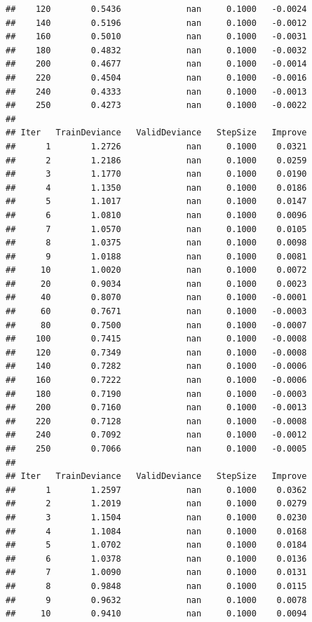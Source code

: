 \documentclass[]{book}
\begin{document}
\begin{verbatim}
##    120        0.5436             nan     0.1000   -0.0024
##    140        0.5196             nan     0.1000   -0.0012
##    160        0.5010             nan     0.1000   -0.0031
##    180        0.4832             nan     0.1000   -0.0032
##    200        0.4677             nan     0.1000   -0.0014
##    220        0.4504             nan     0.1000   -0.0016
##    240        0.4333             nan     0.1000   -0.0013
##    250        0.4273             nan     0.1000   -0.0022
## 
## Iter   TrainDeviance   ValidDeviance   StepSize   Improve
##      1        1.2726             nan     0.1000    0.0321
##      2        1.2186             nan     0.1000    0.0259
##      3        1.1770             nan     0.1000    0.0190
##      4        1.1350             nan     0.1000    0.0186
##      5        1.1017             nan     0.1000    0.0147
##      6        1.0810             nan     0.1000    0.0096
##      7        1.0570             nan     0.1000    0.0105
##      8        1.0375             nan     0.1000    0.0098
##      9        1.0188             nan     0.1000    0.0081
##     10        1.0020             nan     0.1000    0.0072
##     20        0.9034             nan     0.1000    0.0023
##     40        0.8070             nan     0.1000   -0.0001
##     60        0.7671             nan     0.1000   -0.0003
##     80        0.7500             nan     0.1000   -0.0007
##    100        0.7415             nan     0.1000   -0.0008
##    120        0.7349             nan     0.1000   -0.0008
##    140        0.7282             nan     0.1000   -0.0006
##    160        0.7222             nan     0.1000   -0.0006
##    180        0.7190             nan     0.1000   -0.0003
##    200        0.7160             nan     0.1000   -0.0013
##    220        0.7128             nan     0.1000   -0.0008
##    240        0.7092             nan     0.1000   -0.0012
##    250        0.7066             nan     0.1000   -0.0005
## 
## Iter   TrainDeviance   ValidDeviance   StepSize   Improve
##      1        1.2597             nan     0.1000    0.0362
##      2        1.2019             nan     0.1000    0.0279
##      3        1.1504             nan     0.1000    0.0230
##      4        1.1084             nan     0.1000    0.0168
##      5        1.0702             nan     0.1000    0.0184
##      6        1.0378             nan     0.1000    0.0136
##      7        1.0090             nan     0.1000    0.0131
##      8        0.9848             nan     0.1000    0.0115
##      9        0.9632             nan     0.1000    0.0078
##     10        0.9410             nan     0.1000    0.0094

\end{verbatim}
\end{document}
